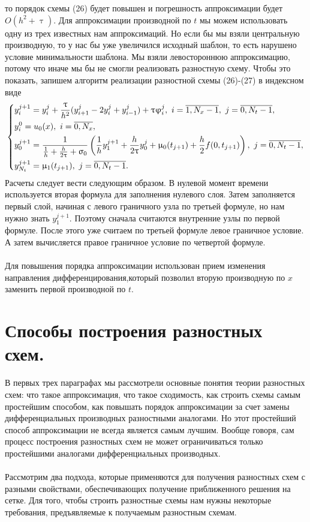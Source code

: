 \documentclass[a4paper, 12pt]{report}
\numberwithin{equation}{section}
\renewcommand{\varphi}{\upvarphi}
\renewcommand{\tau}{\uptau}
\renewcommand{\sigma}{\upsigma}
\renewcommand{\mu}{\upmu}
\begin{document}
	то порядок схемы (26) будет повышен и погрешность аппроксимации будет $O(h^2 + \tau).$ Для аппроксимации производной по $t$ мы можем использовать одну из трех известных нам аппроксимаций. Но если бы мы взяли центральную производную, то у нас бы уже увеличился исходный шаблон, то есть нарушено условие минимальности шаблона. Мы взяли левостороннюю аппроксимацию, потому что иначе мы бы не смогли реализовать разностную схему. Чтобы это показать, запишем алгоритм реализации разностной схемы (26)-(27) в индексном виде
	\begin{equation}
		\begin{dcases}
			y_{i}^{j+1} = y_i^j + \dfrac{\tau}{h^2} (y_{i+1}^j - 2y_i^j + y_{i-1}^j) + \tau \varphi_i^j,\ i = \overline {1, N_x - 1},\ j = \overline {0, N_t -1},\\
			y_i^0 = u_0(x),\ i = \overline {0, N_x},\\
			y_0^{j+1} = \dfrac{1}{\frac 1h + \frac{h}{2\tau} + \sigma_0}\left(\dfrac 1h y_1^{j+1} + \dfrac{h}{2\tau}y_0^{j} + \mu_0(t_{j+1}) + \dfrac h2 f(0, t_{j+1})\right),\ j = \overline{0, N_t - 1},\\
			y_{N_t}^{j+1} = \mu_1(t_{j+1}),\ j = \overline{0, N_t - 1}.
		\end{dcases}
	\end{equation}
	Расчеты следует вести следующим образом. В нулевой момент времени используется вторая формула для заполнения нулевого слоя. Затем заполняется первый слой, начиная с левого граничного узла по третьей формуле, но нам нужно знать $y_1^{j+1}$. Поэтому сначала считаются внутренние узлы по первой формуле. После этого уже считаем по третьей формуле левое граничное условие. А затем вычисляется правое граничное условие по четвертой формуле.\\\\
	Для повышения порядка аппроксимации использован прием изменения направления дифференцирования,который позволил вторую производную по $x$ заменить первой производной по $t$.
	\section{Способы построения разностных схем.}
	В первых трех параграфах мы рассмотрели основные понятия теории разностных схем: что такое аппроксимация, что такое сходимость, как строить схемы самым простейшим способом, как повышать порядок аппроксимации за счет замены дифференциальных производных разностными аналогами. Но этот простейший способ аппроксимации не всегда является самым лучшим. Вообще говоря, сам процесс построения разностных схем не может ограничиваться только простейшими аналогами дифференциальных производных.\\\\
	Рассмотрим два подхода, которые применяются для получения разностных схем с разными свойствами, обеспечивающих получение приближенного решения на сетке. Для того, чтобы строить разностные схемы нам нужны некоторые требования, предъявляемые к получаемым разностным схемам.
\end{document}
